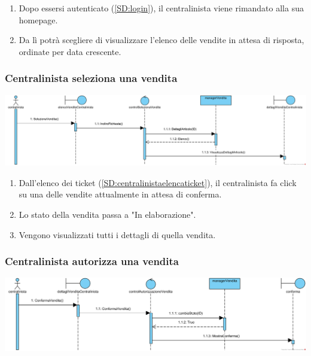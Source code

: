 \documentclass[12pt]{article}
\begin{document}
\begin{enumerate}
\item Dopo essersi autenticato (\ref{SD:login}), il centralinista viene rimandato alla sua homepage. 
\item Da lì potrà scegliere di visualizzare l'elenco delle vendite in attesa di risposta, ordinate per data crescente.
\end{enumerate}

\newpage

\subsubsection{Centralinista seleziona una vendita}
\label{SD:selezionevenditacentralinista}

\begin{center}
\includegraphics[width=\textwidth]{SequenceDiagram/CentralinistaVenditaSeleziona}
\end{center}

\begin{enumerate}
\item Dall'elenco dei ticket (\ref{SD:centralinistaelencaticket}), il centralinista fa click su una delle vendite attualmente in attesa di conferma.
\item Lo stato della vendita passa a "In elaborazione".
\item Vengono visualizzati tutti i dettagli di quella vendita.
\end{enumerate}

\subsubsection{Centralinista autorizza una vendita}
\label{SD:centralinistaautorizza}
\begin{center}
\includegraphics[width=\textwidth]{SequenceDiagram/CentralinistaVenditaAutorizza}
\end{center}
\end{document}
